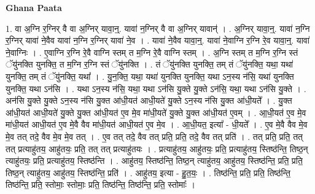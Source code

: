 \documentclass[17pt]{extarticle}
\begin{document}
\textbf{Ghana Paata } \newline

1. वा अ॒ग्नि र॒ग्निर् वै वा अ॒ग्निर् यावा॒न्॒. यावा॑ न॒ग्निर् वै वा अ॒ग्निर् यावान्॑ । . अ॒ग्निर् यावा॒न्॒. यावा॑ न॒ग्नि र॒ग्निर् यावा॑ ने॒वैव यावा॑ न॒ग्नि र॒ग्निर् यावा॑ ने॒व । . यावा॑ ने॒वैव यावा॒न्॒. यावा॑ ने॒वाग्नि र॒ग्नि रे॒व यावा॒न्॒. यावा॑ ने॒वाग्निः । . ए॒वाग्नि र॒ग्नि रे॒वै वाग्नि स्तम् त म॒ग्नि रे॒वै वाग्नि स्तम् । . अ॒ग्नि स्तम् त म॒ग्नि र॒ग्नि स्तं ॅयु॑नक्ति युनक्ति॒ त म॒ग्नि र॒ग्नि स्तं ॅयु॑नक्ति । . तं ॅयु॑नक्ति युनक्ति॒ तम् तं ॅयु॑नक्ति॒ यथा॒ यथा॑ युनक्ति॒ तम् तं ॅयु॑नक्ति॒ यथा᳚ । . यु॒न॒क्ति॒ यथा॒ यथा॑ युनक्ति युनक्ति॒ यथा ऽन॒स्य न॑सि॒ यथा॑ युनक्ति युनक्ति॒ यथा ऽन॑सि । . यथा ऽन॒स्य न॑सि॒ यथा॒ यथा ऽन॑सि यु॒क्ते यु॒क्ते ऽन॑सि॒ यथा॒ यथा ऽन॑सि यु॒क्ते । . अन॑सि यु॒क्ते यु॒क्ते ऽन॒स्य न॑सि यु॒क्त आ॑धी॒यत॑ आधी॒यते॑ यु॒क्ते ऽन॒स्य न॑सि यु॒क्त आ॑धी॒यते᳚ । . यु॒क्त आ॑धी॒यत॑ आधी॒यते॑ यु॒क्ते यु॒क्त आ॑धी॒यत॑ ए॒व मे॒व मा॑धी॒यते॑ यु॒क्ते यु॒क्त आ॑धी॒यत॑ ए॒वम् । . आ॒धी॒यत॑ ए॒व मे॒व मा॑धी॒यत॑ आधी॒यत॑ ए॒व मे॒वै वैव मा॑धी॒यत॑ आधी॒यत॑ ए॒व मे॒व । . आ॒धी॒यत॒ इत्या᳚ - धी॒यते᳚ । . ए॒व मे॒वै वैव मे॒व मे॒व तत् तदे॒ वैव मे॒व मे॒व तत् । . ए॒व तत् तदे॒ वैव तत् प्रति॒ प्रति॒ तदे॒ वैव तत् प्रति॑ । . तत् प्रति॒ प्रति॒ तत् तत् प्रत्याहु॑तय॒ आहु॑तयः॒ प्रति॒ तत् तत् प्रत्याहु॑तयः । . प्रत्याहु॑तय॒ आहु॑तयः॒ प्रति॒ प्रत्याहु॑तय॒ स्तिष्ठ॑न्ति॒ तिष्ठ॒न् त्याहु॑तयः॒ प्रति॒ प्रत्याहु॑तय॒ स्तिष्ठ॑न्ति । . आहु॑तय॒ स्तिष्ठ॑न्ति॒ तिष्ठ॒न् त्याहु॑तय॒ आहु॑तय॒ स्तिष्ठ॑न्ति॒ प्रति॒ प्रति॒ तिष्ठ॒न् त्याहु॑तय॒ आहु॑तय॒ स्तिष्ठ॑न्ति॒ प्रति॑ । . आहु॑तय॒ इत्या - हु॒त॒यः॒ । . तिष्ठ॑न्ति॒ प्रति॒ प्रति॒ तिष्ठ॑न्ति॒ तिष्ठ॑न्ति॒ प्रति॒ स्तोमाः॒ स्तोमाः॒ प्रति॒ तिष्ठ॑न्ति॒ तिष्ठ॑न्ति॒ प्रति॒ स्तोमाः᳚ । \newline
\end{document}
